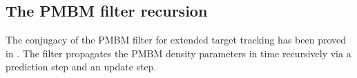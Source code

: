 
\subsection{The PMBM filter recursion}
The conjugacy of the PMBM filter for extended target tracking has been proved in \cite{pmbmextended2}. The filter propagates the PMBM density parameters in time recursively via a prediction step and an update step. 

